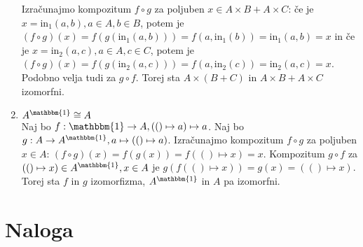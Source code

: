 \documentclass[12pt]{article}
\newcommand{\naloga}{\section{Naloga}}
\newcommand{\inj}[2][\text{}]{\text{in}_{#2}^{#1}}
\begin{document}
\begin{enumerate}[label=(\alph*)]
            Izračunajmo kompozitum \(f \circ g\) za poljuben \(x \in A \times B + A \times C\): če je \(x = \inj{1}\left(a, b\right), a \in A, b \in B\), potem je
            \(\left(f \circ g\right)(x) = f(g(\inj{1}\left(a, b\right))) = f\left(a, \inj{1}(b)\right) = \inj{1}\left(a, b\right) = x\) in če je \(x = \inj{2}\left(a, c\right), a \in A, c \in C\), potem je
            \(\left(f \circ g\right)(x) = f(g(\inj{2}\left(a, c\right))) = f\left(a, \inj{2}(c)\right) = \inj{2}\left(a, c\right) = x\).
            Podobno velja tudi za \(g \circ f\). Torej sta \(A \times \left(B + C\right)\) in \(A \times B + A \times C\) izomorfni.
        \item \(A^\mathbbm{1} \cong A\) \\
            Naj bo \(f : \mathbbm{1} \rightarrow A, \left(() \mapsto a\right) \mapsto a\). Naj bo \(g : A \rightarrow A ^{\mathbbm{1}}, a \mapsto \left(() \mapsto a\right)\).
            Izračunajmo kompozitum \(f \circ g\) za poljuben \(x \in A\): \(\left(f \circ g\right)(x) = f(g(x)) = f\left(() \mapsto x\right) = x\).
            Kompozitum \(g \circ f\) za \(\left(() \mapsto x\right) \in A ^ \mathbbm{1}, x \in A\) je \(g\left(f\left(() \mapsto x\right)\right) = g\left(x\right) = \left(() \mapsto x\right)\).
            Torej sta \(f\) in \(g\) izomorfizma, \(A ^ \mathbbm{1}\) in \(A\) pa izomorfni. 
    \end{enumerate}

\naloga
\end{document}
